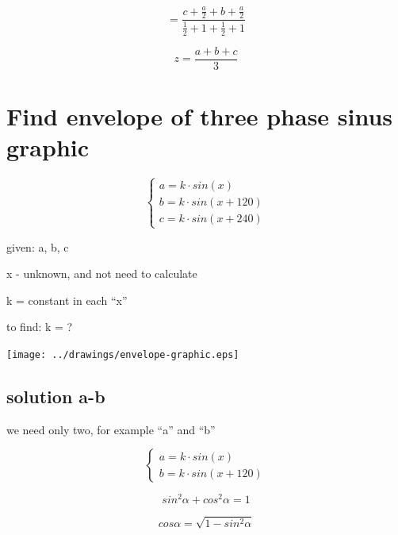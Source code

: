 \documentclass[unicode, 12pt, a4paper]{article}
\begin{document}
\begin{equation}
  = \frac{c + \frac{a}{2} + b + \frac{a}{2}}{\frac{1}{2} + 1 + \frac{1}{2} + 1}
\end{equation}


\begin{equation}
  z = \frac{a + b + c}{3}
\end{equation}


\section{Find envelope of three phase sinus graphic}

\begin{equation}
  \label{eq:envelope:three-phase-case}
  \begin{cases}
    a = k \cdot sin(x)\\
    b = k \cdot sin(x + 120)\\
    c = k \cdot sin(x + 240)
  \end{cases}
\end{equation}

given: a, b, c

x - unknown, and not need to calculate

k = constant in each ``x''

to find: k = ?

\texttt{[image: ../drawings/envelope-graphic.eps]}

\subsection{solution a-b}

we need only two, for example ``a'' and ``b''

\begin{equation}
  \label{eq:envelope:phase-a-b}
  \begin{cases}
    a = k \cdot sin(x)\\
    b = k \cdot sin(x + 120)
  \end{cases}
\end{equation}


\begin{equation}
  sin^2 \alpha + cos^2 \alpha = 1
\end{equation}

\begin{equation}
  \label{eq:trigonometric:rule:sin2acos2aeq1}
  cos \alpha = \sqrt{1 - sin^2 \alpha}
\end{equation}
\end{document}
